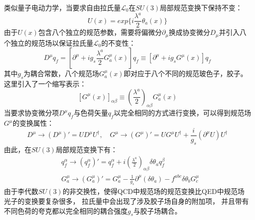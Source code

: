 类似量子电动力学，当要求自由拉氏量$\mathcal{L}_0$在$SU(3)$局部规范变换下保持不变：
\begin{equation} 
\label{eq:QCD5}
U(x)=exp\Bigg\{ i\frac{\lambda^{a}}{2}\theta_a(x) \Bigg\} 
\end{equation}
由于$U(x)$包含八个独立的规范参数，需要将偏微分$\partial_{\mu}$换成协变微分$D_{\mu}$并引入八个独立的规范场以保证拉氏量$\mathcal{L}_0$的不变性：
\begin{equation} 
\label{eq:QCD6}
D^{\mu}q_f=\left[   \partial^{\mu}+ig_s\frac{\lambda^{a}}{2}G^{\mu}_a(x)  \right] q_f \equiv
\left[   \partial^{\mu}+ig_sG^{\mu}(x) \right] q_f
\end{equation}
其中$g_s$为耦合常数，八个规范场$G^{\mu}_a(x)$即对应于八个不同的规范玻色子，胶子。
这里引入了一个缩写表示：
\begin{equation} 
\label{eq:QCD7}
\left[G^{\mu}(x)\right]_{\alpha\beta} \equiv \left( \frac{\lambda^{a}}{2} \right)_{\alpha\beta}G^{\mu}_a(x) 
\end{equation}
当要求协变微分项$D^{\mu} q_f$与色荷矢量$q_f$以完全相同的方式进行变换，可以得到规范场$G^{\mu}$的变换属性：
\begin{equation} 
\label{eq:QCD8}
D^{\mu} \rightarrow (D^{\mu})' = UD^{\mu}U^{\dagger}, \quad 
G^{\mu} \rightarrow (G^{\mu})'=UG^{\mu}U^{\dagger}+\frac{i}{g_s}(\partial^{\mu}U)U^{\dagger}
\end{equation}
由此，在$SU(3)$局部规范变换下有：
\begin{equation} 
\label{eq:QCD9}
 \begin{split}
  & q_f^{\alpha}\rightarrow (q_f^{\alpha})'=q_f^{\alpha}+i\left( \frac{\lambda^{a}}{2} \right)_{\alpha\beta}\delta\theta_a q_f^{\beta}
   \\
  & G^{\mu}_a\rightarrow (G^{\mu}_a)'=G^{\mu}_a-\frac{1}{g_s}\partial^{\mu}\left(\delta\theta_a\right)-f^{abc}\delta\theta_bG^{\mu}_c
  \end{split}
\end{equation}
由于李代数$SU(3)$的非交换性，使得QCD中规范场的规范变换比QED中规范场光子的变换要复杂很多，
拉氏量中会出现了涉及胶子场自身的附加项，
并且带有不同色荷的夸克都以完全相同的耦合强度$g_s$与胶子场耦合。

